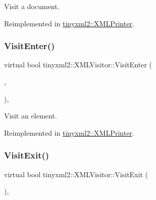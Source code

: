 Visit a document. 



Reimplemented in \hyperlink{classtinyxml2_1_1_x_m_l_printer_a9aa1de11a55a07db55a90fde37d7afad}{tinyxml2\+::\+X\+M\+L\+Printer}.

\mbox{\label{classtinyxml2_1_1_x_m_l_visitor_af97980a17dd4e37448b181f5ddfa92b5}} 
\subsubsection{\texorpdfstring{Visit\+Enter()}{VisitEnter()}\hspace{0.1cm}{\footnotesize\ttfamily [2/2]}}
{\footnotesize\ttfamily virtual bool tinyxml2\+::\+X\+M\+L\+Visitor\+::\+Visit\+Enter (\begin{DoxyParamCaption}\item[{const \hyperlink{classtinyxml2_1_1_x_m_l_element}{X\+M\+L\+Element} \&}]{,  }\item[{const \hyperlink{classtinyxml2_1_1_x_m_l_attribute}{X\+M\+L\+Attribute} $\ast$}]{ }\end{DoxyParamCaption})\hspace{0.3cm}{\ttfamily [inline]}, {\ttfamily [virtual]}}



Visit an element. 



Reimplemented in \hyperlink{classtinyxml2_1_1_x_m_l_printer_a169b2509d8eabb70811b2bb8cfd1f5d1}{tinyxml2\+::\+X\+M\+L\+Printer}.

\mbox{\label{classtinyxml2_1_1_x_m_l_visitor_a170e9989cd046ba904f302d087e07086}} 
\subsubsection{\texorpdfstring{Visit\+Exit()}{VisitExit()}\hspace{0.1cm}{\footnotesize\ttfamily [1/2]}}
{\footnotesize\ttfamily virtual bool tinyxml2\+::\+X\+M\+L\+Visitor\+::\+Visit\+Exit (\begin{DoxyParamCaption}\item[{const \hyperlink{classtinyxml2_1_1_x_m_l_document}{X\+M\+L\+Document} \&}]{ }\end{DoxyParamCaption})\hspace{0.3cm}{\ttfamily [inline]}, {\ttfamily [virtual]}}



